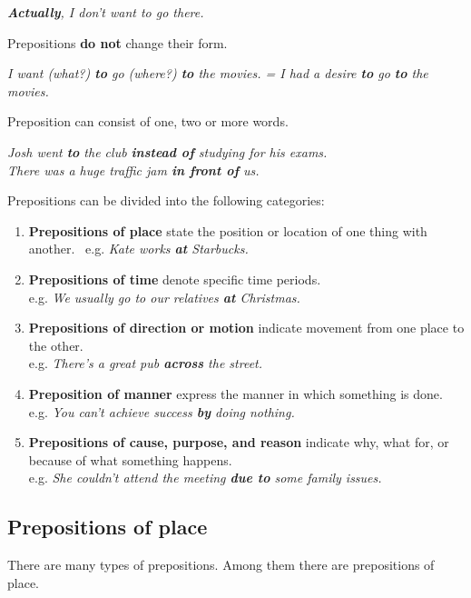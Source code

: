 \documentclass[hidelinks,10pt,a4paper]{article}
\begin{document}
\begin{center}
	\textit{\textbf{Actually}, I don't want to go there.}
\end{center}

Prepositions \textbf{do not} change their form.

\begin{center}
	\textit{I want (what?) \textbf{to} go (where?) \textbf{to} the movies. =
	I had a desire \textbf{to} go \textbf{to} the movies.}
\end{center}

Preposition can consist of one, two or more words.

\begin{center}
	\textit{Josh went \textbf{to} the club \textbf{instead of} studying for his exams. \\
	There was a huge traffic jam \textbf{in front of} us.}
\end{center}

Prepositions can be divided into the following categories:
\begin{enumerate}[label=(\alph*)]
	\item \textbf{Prepositions of place} state the position or location of one thing with another. \
		e.g. \textit{Kate works \textbf{at} Starbucks.}
	\item \textbf{Prepositions of time} denote specific time periods. \\
		e.g. \textit{We usually go to our relatives \textbf{at} Christmas.}
	\item \textbf{Prepositions of direction or motion} indicate movement from one place to the other. \\
		e.g. \textit{There's a great pub \textbf{across} the street.}
	\item \textbf{Preposition of manner} express the manner in which something is done. \\
		e.g. \textit{You can't achieve success \textbf{by} doing nothing.}
	\item \textbf{Prepositions of cause, purpose, and reason} indicate why, what for, or because of what something happens. \\
		e.g. \textit{She couldn't attend the meeting \textbf{due to} some family issues.}
\end{enumerate}

\subsection{Prepositions of place}
There are many types of prepositions. Among them there are prepositions of place.
\end{document}
